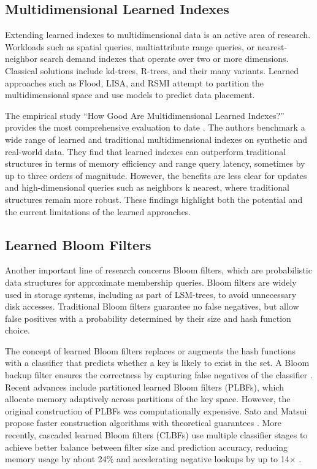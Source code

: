 \documentclass[sigconf]{acmart}
\begin{document}
\subsection{Multidimensional Learned Indexes}

Extending learned indexes to multidimensional data is an active area
of research. Workloads such as spatial queries, multiattribute range
queries, or nearest-neighbor search demand indexes that operate over
two or more dimensions. Classical solutions include kd-trees, R-trees,
and their many variants. Learned approaches such as Flood, LISA, and
RSMI attempt to partition the multidimensional space and use models to
predict data placement.

The empirical study ``How Good Are Multidimensional Learned
Indexes?'' provides the most comprehensive evaluation to date
\cite{howgood2024}. The authors benchmark a wide range of learned and
traditional multidimensional indexes on synthetic and real-world data.
They find that learned indexes can outperform traditional structures
in terms of memory efficiency and range query latency, sometimes by up
to three orders of magnitude. However, the benefits are less clear for
updates and high-dimensional queries such as neighbors k nearest,
where traditional structures remain more robust. These findings
highlight both the potential and the current limitations of the learned
approaches.

\subsection{Learned Bloom Filters}

Another important line of research concerns Bloom filters, which are
probabilistic data structures for approximate membership queries.
Bloom filters are widely used in storage systems, including as part of
LSM-trees, to avoid unnecessary disk accesses. Traditional Bloom
filters guarantee no false negatives, but allow false positives with a
probability determined by their size and hash function choice.

The concept of learned Bloom filters replaces or augments the hash
functions with a classifier that predicts whether a key is likely to
exist in the set. A Bloom backup filter ensures the correctness by
capturing false negatives of the classifier
\cite{kraska2018case}. Recent advances include partitioned learned
Bloom filters (PLBFs), which allocate memory adaptively across
partitions of the key space. However, the original construction of
PLBFs was computationally expensive. Sato and Matsui propose faster
construction algorithms with theoretical guarantees
\cite{sato2024fast}. More recently, cascaded learned Bloom filters
(CLBFs) use multiple classifier stages to achieve better balance
between filter size and prediction accuracy, reducing memory usage by
about 24\% and accelerating negative lookups by up to 14$\times$
\cite{sato2025cascaded}.
\end{document}
